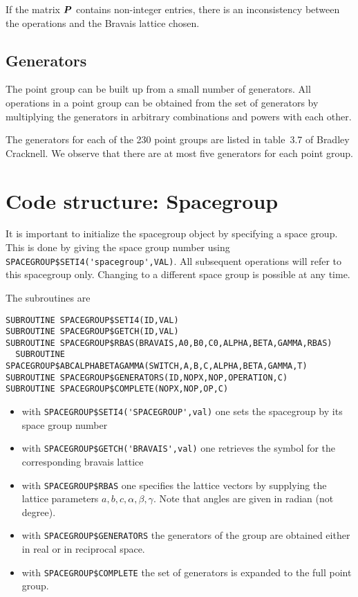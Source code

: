 \documentclass[11pt,a4paper]{report}
\begin{document}
If the matrix $\bm{P}$ contains non-integer entries, there is an
inconsistency between the operations and the Bravais lattice chosen.




\subsection{Generators}
The point group can be built up from a small number of generators.
All operations in a point group can be obtained from the set of
generators by multiplying the generators in arbitrary combinations
and powers with each other. 

The generators for each of the 230 point groups are listed in
table~3.7 of Bradley Cracknell. We observe that there are at most five
generators for each point group.


\section{Code structure: Spacegroup}
It is important to initialize the spacegroup object by specifying a
space group. This is done by giving the space group number using
\verb|SPACEGROUP$SETI4('spacegroup',VAL)|. All subsequent operations
will refer to this spacegroup only. Changing to a different space
group is possible at any time.

The subroutines are
\begin{verbatim}
SUBROUTINE SPACEGROUP$SETI4(ID,VAL)
SUBROUTINE SPACEGROUP$GETCH(ID,VAL)
SUBROUTINE SPACEGROUP$RBAS(BRAVAIS,A0,B0,C0,ALPHA,BETA,GAMMA,RBAS)
  SUBROUTINE SPACEGROUP$ABCALPHABETAGAMMA(SWITCH,A,B,C,ALPHA,BETA,GAMMA,T)
SUBROUTINE SPACEGROUP$GENERATORS(ID,NOPX,NOP,OPERATION,C)
SUBROUTINE SPACEGROUP$COMPLETE(NOPX,NOP,OP,C)
\end{verbatim}

\begin{itemize}
\item with \verb|SPACEGROUP$SETI4('SPACEGROUP',val)| one sets the
  spacegroup by its space group number
%
\item with \verb|SPACEGROUP$GETCH('BRAVAIS',val)| one retrieves the
  symbol for the corresponding bravais lattice
%
\item with \verb|SPACEGROUP$RBAS| one specifies the lattice vectors by
  supplying the lattice parameters $a,b,c,\alpha,\beta,\gamma$. Note
  that angles are given in radian (not degree).
%
\item with \verb|SPACEGROUP$GENERATORS| the generators of the group
  are obtained either in real or in reciprocal space.
%
\item with \verb|SPACEGROUP$COMPLETE| the set of generators is
  expanded to the full point group.
\end{itemize}
\end{document}
